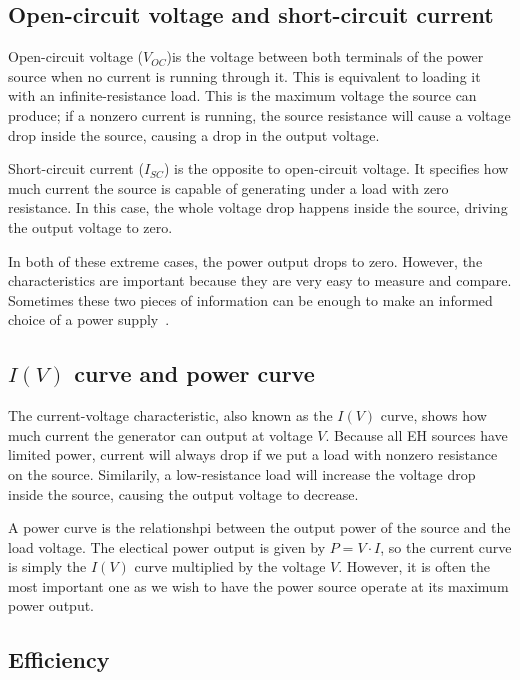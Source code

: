 \documentclass[a4paper,10pt]{article}
\begin{document}
\subsection{Open-circuit voltage and short-circuit current}

Open-circuit voltage ($V_{OC}$)is the voltage between both terminals of the power source when no current is running through it. This is equivalent to loading it with an infinite-resistance load. This is the maximum voltage the source can produce; if a nonzero current is running, the source resistance will cause a voltage drop inside the source, causing a drop in the output voltage. 

Short-circuit current ($I_{SC}$) is the opposite to open-circuit voltage. It specifies how much current the source is capable of generating under a load with zero resistance. In this case, the whole voltage drop happens inside the source, driving the output voltage to zero. 

In both of these extreme cases, the power output drops to zero. However, the characteristics are important because they are very easy to measure and compare. Sometimes these two pieces of information can be enough to make an informed choice of a power supply~\cite{Salerno10}. 

\subsection{$I(V)$ curve and power curve}

The current-voltage characteristic, also known as the $I(V)$ curve, shows how much current the generator can output at voltage $V$. Because all \ac{EH} sources have limited power, current will always drop if we put a load with nonzero resistance on the source. Similarily, a low-resistance load will increase the voltage drop inside the source, causing the output voltage to decrease. 

A power curve is the relationshpi between the output power of the source and the load voltage. The electical power output is given by $P = V \cdot I$, so the current curve is simply the $I(V)$ curve multiplied by the voltage $V$. However, it is often the most important one as we wish to have the power source operate at its maximum power output. 

\subsection{Efficiency}
\end{document}

